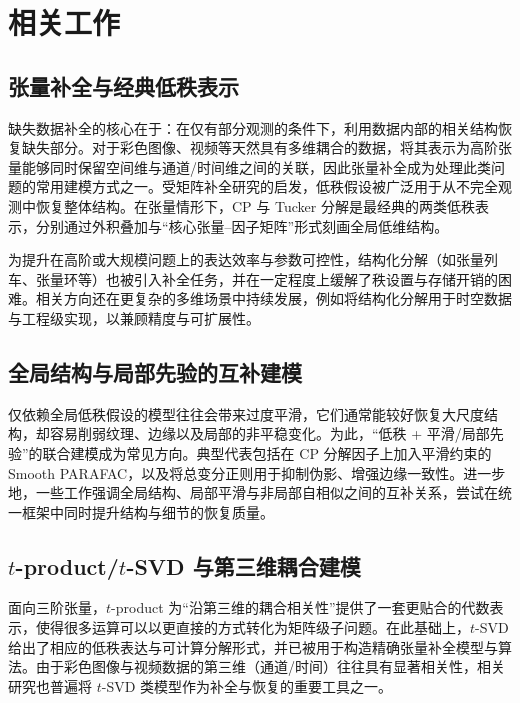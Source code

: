 \documentclass[UTF8]{ctexart}
\begin{document}
\section{相关工作}
\subsection{张量补全与经典低秩表示}
缺失数据补全的核心在于：在仅有部分观测的条件下，利用数据内部的相关结构恢复缺失部分。对于彩色图像、视频等天然具有多维耦合的数据，将其表示为高阶张量能够同时保留空间维与通道/时间维之间的关联，因此张量补全成为处理此类问题的常用建模方式之一\cite{liu2013tensor,panagakis2021tensorcvdl}。受矩阵补全研究的启发，低秩假设被广泛用于从不完全观测中恢复整体结构\cite{candes2009matrix}。在张量情形下，CP 与 Tucker 分解是最经典的两类低秩表示，分别通过外积叠加与“核心张量--因子矩阵”形式刻画全局低维结构\cite{kolda2009tensor}。


为提升在高阶或大规模问题上的表达效率与参数可控性，结构化分解（如张量列车、张量环等）也被引入补全任务，并在一定程度上缓解了秩设置与存储开销的困难\cite{oseledets2011tt,bengua2017tt}。相关方向还在更复杂的多维场景中持续发展，例如将结构化分解用于时空数据与工程级实现，以兼顾精度与可扩展性\cite{yuan2019tensor,chen2025geotensor}。

\subsection{全局结构与局部先验的互补建模}
仅依赖全局低秩假设的模型往往会带来过度平滑，它们通常能较好恢复大尺度结构，却容易削弱纹理、边缘以及局部的非平稳变化。为此，“低秩 + 平滑/局部先验”的联合建模成为常见方向。典型代表包括在 CP 分解因子上加入平滑约束的 Smooth PARAFAC\cite{yokota2016smooth}，以及将总变分正则用于抑制伪影、增强边缘一致性\cite{rudin1992rof,li2017tv}。进一步地，一些工作强调全局结构、局部平滑与非局部自相似之间的互补关系，尝试在统一框架中同时提升结构与细节的恢复质量\cite{zhao2021complementary,yuan2019tensor}。

\subsection{$t$-product/$t$-SVD 与第三维耦合建模}
面向三阶张量，$t$-product 为“沿第三维的耦合相关性”提供了一套更贴合的代数表示，使得很多运算可以以更直接的方式转化为矩阵级子问题\cite{kilmer2011factorization,kilmer2013operators}。在此基础上，$t$-SVD 给出了相应的低秩表达与可计算分解形式，并已被用于构造精确张量补全模型与算法\cite{zhang2017tsvd}。由于彩色图像与视频数据的第三维（通道/时间）往往具有显著相关性，相关研究也普遍将 $t$-SVD 类模型作为补全与恢复的重要工具之一\cite{panagakis2021tensorcvdl}。
\end{document}
